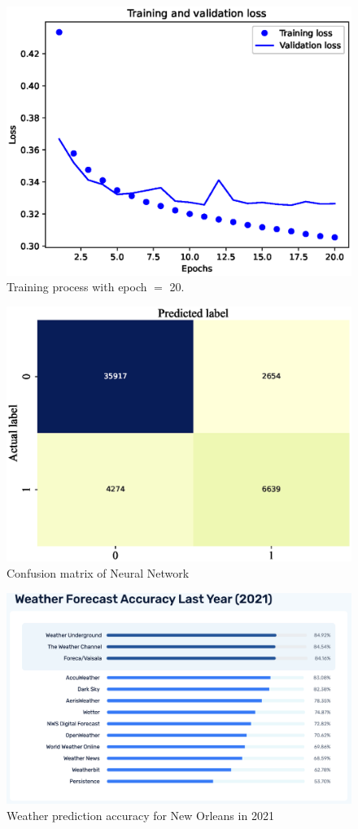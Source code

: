 \documentclass[11pt, a4paper, jou]{apa7}
\begin{document}
\begin{figure}[h]
    \centering
    \caption{Training process with epoch $=$ 20. }\label{fig:NN_process_20}
    \includegraphics[width=.45\textwidth]{figures/error_20.eps}
\end{figure}

\begin{figure}[h]
    \centering
    \caption{Confusion matrix of Neural Network}\label{fig:FC_confusion_matrix}
    \includegraphics[width=.45\textwidth]{figures/FC_confusion_matrix.eps}
\end{figure}

\begin{table}[h]
    \centering
    \caption{Neural Network summary}
    \label{tab:FC_summary}
\end{table}

\begin{figure}[h]
    \centering
    \caption{Weather prediction accuracy for New Orleans in 2021}\label{fig:weather_prediction_nola}
    \includegraphics[width=.45\textwidth]{figures/Weather2021.png}
\end{figure}
\end{document}
